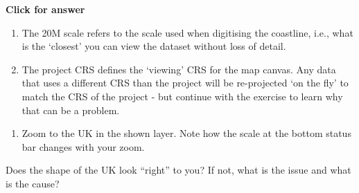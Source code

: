 \documentclass[
  letterpaper,
  DIV=11,
  numbers=noendperiod]{scrreprt}
\providecommand{\tightlist}{%
  \setlength{\itemsep}{0pt}\setlength{\parskip}{0pt}}\usepackage{longtable,booktabs,array}
\begin{document}
\begin{tcolorbox}[enhanced jigsaw, toprule=.15mm, breakable, left=2mm, colframe=quarto-callout-important-color-frame, colback=white, arc=.35mm, leftrule=.75mm, opacityback=0, rightrule=.15mm, bottomrule=.15mm]

\vspace{-3mm}\textbf{Click for answer}\vspace{3mm}

\begin{enumerate}
\def\labelenumi{\alph{enumi})}
\item
  The 20M scale refers to the scale used when digitising the coastline,
  i.e., what is the `closest' you can view the dataset without loss of
  detail.
\item
  The project CRS defines the `viewing' CRS for the map canvas. Any data
  that uses a different CRS than the project will be re-projected `on
  the fly' to match the CRS of the project - but continue with the
  exercise to learn why that can be a problem.
\end{enumerate}

\end{tcolorbox}

\begin{enumerate}
\def\labelenumi{(\arabic{enumi})}
\setcounter{enumi}{51}
\tightlist
\item
  Zoom to the UK in the shown layer. Note how the scale at the bottom
  status bar changes with your zoom.
\end{enumerate}

\begin{tcolorbox}[enhanced jigsaw, coltitle=black, toprule=.15mm, breakable, opacitybacktitle=0.6, left=2mm, colback=white, leftrule=.75mm, rightrule=.15mm, colbacktitle=quarto-callout-important-color!10!white, toptitle=1mm, titlerule=0mm, colframe=quarto-callout-important-color-frame, arc=.35mm, bottomtitle=1mm, opacityback=0, bottomrule=.15mm, title=\textcolor{quarto-callout-important-color}{\faExclamation}\hspace{0.5em}{Stop and Think}]

Does the shape of the UK look ``right'' to you? If not, what is the
issue and what is the cause?

\end{tcolorbox}
\end{document}
